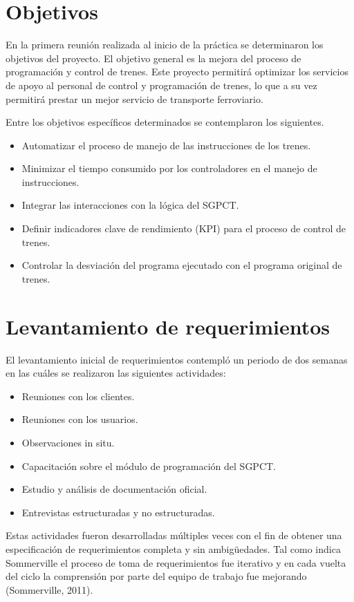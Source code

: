 \documentclass[oneside,12pt, letterpaper, titlepage]{book}
\begin{document}
\section{Objetivos}
En la primera reunión realizada al inicio de la práctica se determinaron los objetivos del proyecto. El objetivo general es la mejora del proceso de programación y control de trenes. Este proyecto permitirá optimizar los servicios de apoyo al personal de control y programación de trenes, lo que a su vez permitirá prestar un mejor servicio de transporte ferroviario. 

Entre los objetivos específicos determinados se contemplaron los siguientes.

\begin{itemize}
\item Automatizar el proceso de manejo de las instrucciones de los trenes.
\item Minimizar el tiempo consumido por los controladores en el manejo de instrucciones.
\item Integrar las interacciones con la lógica del SGPCT.
\item Definir indicadores clave de rendimiento (KPI) para el proceso de control de trenes.
\item Controlar la desviación del programa ejecutado con el programa original de trenes.
\end{itemize}

\section{Levantamiento de requerimientos}
El levantamiento inicial de requerimientos contempló un periodo de dos semanas en las cuáles se realizaron las siguientes actividades:

\begin{itemize}
\item Reuniones con los clientes.
\item Reuniones con los usuarios.
\item Observaciones in situ.
\item Capacitación sobre el módulo de programación del SGPCT.
\item Estudio y análisis de documentación oficial.
\item Entrevistas estructuradas y no estructuradas.

\end{itemize}

Estas actividades fueron desarrolladas múltiples veces con el fin de obtener una especificación de requerimientos completa y sin ambigüedades. Tal como indica Sommerville el proceso de toma de requerimientos fue iterativo y en cada vuelta del ciclo la comprensión por parte del equipo de trabajo fue mejorando (Sommerville, 2011). 
\end{document}
